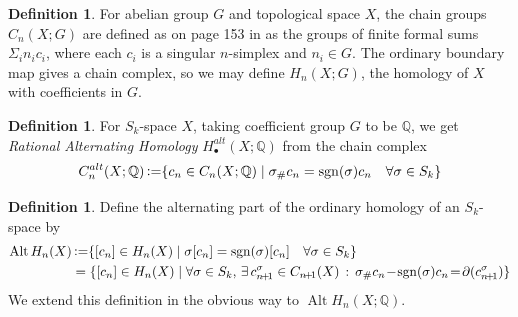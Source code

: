 \documentclass[11pt,a4paper,twoside]{article}
\theoremstyle{plain}
\theoremstyle{definition}
\newtheorem{defn}[thm]{Definition}
\theoremstyle{definition}
\theoremstyle{definition}
\theoremstyle{definition}
\theoremstyle{definition}
\DeclareMathOperator{\Alt}{Alt}
\DeclareMathOperator{\sgn}{sgn}
\DeclareMathOperator{\coloneqq}{\vcentcolon=}
\begin{document}
\begin{defn}\label{Def:HomologyWithCoeff}
For abelian group $G$ and topological space $X$, the chain groups $C_n(X;G)$ are defined as on page 153 in \cite{algebraictopology} as the groups of finite formal sums $\Sigma_in_ic_i$, where each $c_i$ is a singular $n$-simplex and $n_i\in G$. The ordinary boundary map gives a chain complex, so we may define $H_n(X;G)$, the homology of $X$ with coefficients in $G$.
\end{defn}
\begin{defn}\label{Def:AltHomWCoeff}
For $S_k$-space $X$, taking coefficient group $G$ to be $\mathbb{Q}$, we get \emph{Rational Alternating Homology} $H_\bullet^{alt}(X;\mathbb{Q})$ from the chain complex
$$C_n^{alt}(X;\mathbb{Q})\coloneqq\{c_n\in C_n(X;\mathbb{Q})\mid \sigma_\#c_n=\sgn(\sigma)c_n\quad\forall\sigma\in S_k\}$$
\end{defn}

\begin{defn}\label{Def:AltPartHom}
Define the alternating part of the ordinary homology of an $S_k$-space by
\begin{alignat*}{3}
\Alt H_n(X) & \coloneqq \{[c_n]\in H_n(X) \mid \sigma[c_n]=\sgn(\sigma)[c_n]\quad\forall\sigma\in S_k\} \\
&=\{[c_n]\in H_n(X)\mid \forall\sigma\in S_k,\, \exists\, c_{n\!+\!1}^\sigma\in C_{n\!+\!1}(X)\,:\, \sigma_\#c_n\!-\!\sgn(\sigma)c_n\!=\!\partial(c_{n\!+\!1}^\sigma)\}
\end{alignat*}
We extend this definition in the obvious way to $\Alt H_n(X;\mathbb{Q})$.
\end{defn}
\end{document}
